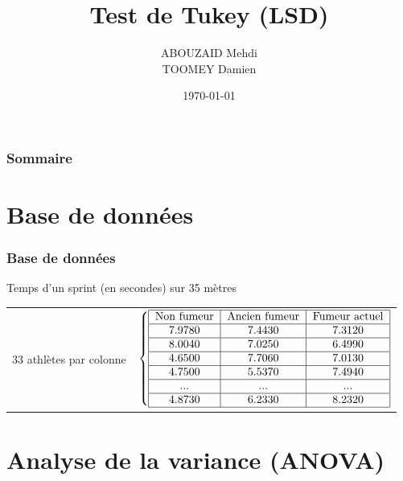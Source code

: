 \documentclass{beamer}
\title{Test de Tukey (LSD)}
\author[MA \--- DT]{ABOUZAID Mehdi \\ TOOMEY Damien}
\institute[INSA Rouen]{INSA \--- Institut National des Sciences Appliquées de Rouen}
\date{\today}
\newif\ifplacelogo %
\begin{document}
\begin{frame}
\titlepage
\end{frame}

\placelogofalse
\begin{frame}
\frametitle{Sommaire} 
\tableofcontents
\end{frame}	

\section{Base de données}

\begin{frame}
\frametitle{Base de données}

Temps d'un sprint (en secondes) sur 35 mètres 

\begin{center}
\begin{tabular}{r@{}c}    
  33 athlètes par colonne & $\left\{
\begin{tabular}{ |c|c|c| }
\hline
Non fumeur & Ancien fumeur & Fumeur actuel \\ 
\hline
7.9780 & 7.4430 & 7.3120 \\
\hline  
8.0040 & 7.0250 & 6.4990 \\
\hline  
4.6500 & 7.7060 & 7.0130 \\   
\hline  
4.7500 & 5.5370 & 7.4940 \\   
\hline
... & ... & ... \\    
\hline  
4.8730 & 6.2330 & 8.2320 \\  
\hline
\end{tabular}
  \right.\kern-\nulldelimiterspace$
\end{tabular}
\end{center}

\end{frame}

\section{Analyse de la variance (ANOVA)}
\end{document}
